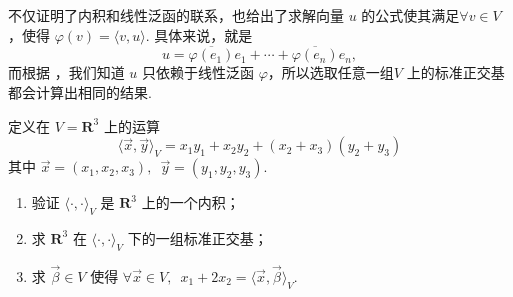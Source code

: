不仅证明了内积和线性泛函的联系，也给出了求解向量 $ u $ 的公式使其满足$ \forall v \in V $，使得 $ \varphi(v) = \langle v, u\rangle $. 具体来说，就是
\[ u = \overline{\varphi(e_1)}e_1 + \cdots + \overline{\varphi(e_n)}e_n, \]
而根据 ，我们知道 $ u $ 只依赖于线性泛函 $ \varphi $，所以选取任意一组$ V $ 上的标准正交基都会计算出相同的结果.

\begin{example}{}{}
    定义在 $ V = \mathbf{R}^3 $ 上的运算
    \[ \langle \vec{x}, \vec{y} \rangle_V = x_1 y_1 + x_2 y_2 + (x_2 + x_3)(y_2 + y_3) \]
    其中 $ \vec{x} = (x_1, x_2, x_3),\enspace \vec{y} = (y_1, y_2, y_3) $.
    \begin{enumerate}
        \item 验证 $ \langle \cdot, \cdot \rangle_V $ 是 $ \mathbf{R}^3 $ 上的一个内积；

        \item 求 $ \mathbf{R}^3 $ 在 $ \langle \cdot, \cdot \rangle_V $ 下的一组标准正交基；

        \item 求 $ \vec{\beta} \in V $ 使得 $ \forall \vec{x} \in V,\enspace x_1 + 2x_2 = \langle \vec{x}, \vec{\beta} \rangle_V $.
    \end{enumerate}
\end{example}

